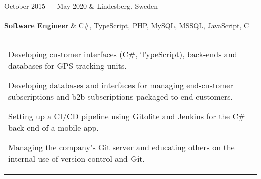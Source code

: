 \documentclass{cv-stylish}
\begin{document}
\begin{center}
\begin{JobTable}
  October 2015 --- May 2020 & \hfill Lindesberg, Sweden \\[3pt]
   \\[3pt]
  \hspace{5mm} \textbf{Software Engineer}
  & \hfill C\#, TypeScript, PHP, MySQL, MSSQL, JavaScript, C \\
\end{JobTable}
\begin{tabularx}{0.97\linewidth}{X}
\begin{compactitem}
  \item Developing customer interfaces (C\#, TypeScript), back-ends
    and databases for GPS-tracking units.
  \item Developing databases and interfaces for managing end-customer
    subscriptions and b2b subscriptions packaged to end-customers.
  \item Setting up  a CI/CD pipeline using Gitolite and Jenkins for the C\#
    back-end of a mobile app.
  \item Managing the company's Git server and educating others on the
    internal use of version control and Git.
\end{compactitem}
\end{tabularx}


\end{center}
\end{document}
